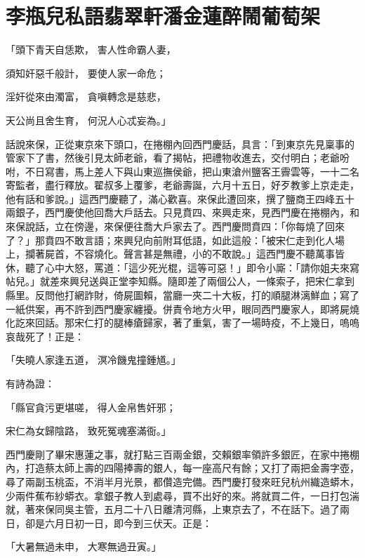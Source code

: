 %

\chapter{李瓶兒私語翡翠軒\KG 潘金蓮醉鬧葡萄架}


「頭下青天自恁欺，  害人性命霸人妻，

須知奸惡千般計，  要使人家一命危；

淫奸從來由濁富，  貪嗔轉念是慈悲，

天公尚且舍生育，  何況人心忒妄為。」

話說來保，正從東京來下頭口，在捲棚內回西門慶話，具言：「到東京先見稟事的管家下了書，然後引見太師老爺，看了揭帖，把禮物收進去，交付明白；老爺吩咐，不日寫書，馬上差人下與山東巡撫侯爺，把山東滄州鹽客王霽雲等，一十二名寄監者，盡行釋放。翟叔多上覆爹，老爺壽誕，六月十五日，好歹教爹上京走走，他有話和爹說。」這西門慶聽了，滿心歡喜。來保此遭回來，撰了鹽商王四峰五十兩銀子，西門慶使他回喬大戶話去。只見賁四、來興走來，見西門慶在捲棚內，和來保說話，立在傍邊，來保便往喬大戶家去了。西門慶問賁四：「你每燒了回來了？」那賁四不敢言語；來興兒向前附耳低語，如此這般：「被宋仁走到化人場上，攔著屍首，不容燒化。聲言甚是無禮，小的不敢說。」這西門慶不聽萬事皆休，聽了心中大怒，罵道：「這少死光棍，這等可惡！」即令小廝：「請你姐夫來寫帖兒。」就差來興兒送與正堂李知縣。隨即差了兩個公人，一條索子，把宋仁拿到縣里。反問他打網詐財，倚屍圖賴，當廳一夾二十大板，打的順腿淋漓鮮血；寫了一紙供案，再不許到西門慶家纏擾。併責令地方火甲，眼同西門慶家人，即將屍燒化訖來回話。那宋仁打的腿棒瘡歸家，著了重氣，害了一場時疫，不上幾日，嗚嗚哀哉死了！正是：

「失曉人家逢五道，  溟冷饑鬼撞鍾馗。」

有詩為證：

「縣官貪污更堪嗟，  得人金帛售奸邪；

宋仁為女歸陰路，  致死冤魂塞滿衙。」

西門慶剛了畢宋惠蓮之事，就打點三百兩金銀，交賴銀率領許多銀匠，在家中捲棚內，打造蔡太師上壽的四陽捧壽的銀人，每一座高尺有餘；又打了兩把金壽字壺，尋了兩副玉桃盃，不消半月光景，都儹造完備。西門慶打發來旺兒杭州織造蟒木，少兩件蕉布紗蟒衣。拿銀子教人到處尋，買不出好的來。將就買二件，一日打包湍就，著來保同吳主管，五月二十八日離清河縣，上東京去了，不在話下。過了兩日，卻是六月日初一日，即今到三伏天。正是：

「大暑無過未申，  大寒無過丑寅。」

